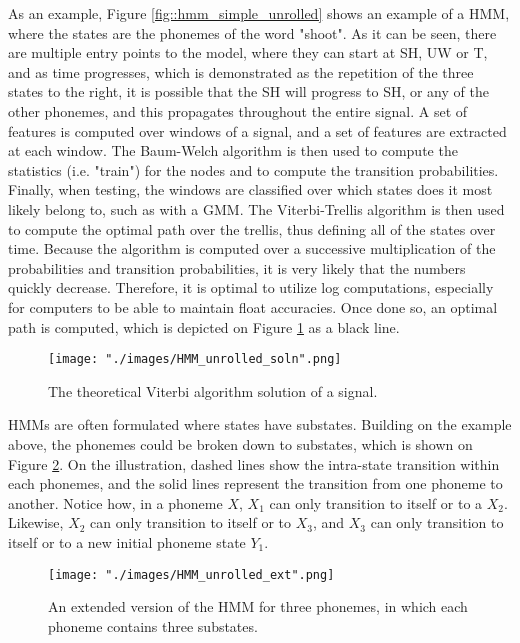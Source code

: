 As an example, Figure \ref{fig::hmm_simple_unrolled} shows an example of a HMM, where the states are the phonemes of the word "shoot". As it can be seen, there are multiple entry points to the model, where they can start at SH, UW or T, and as time progresses, which is demonstrated as the repetition of the three states to the right, it is possible that the SH will progress to SH, or any of the other phonemes, and this propagates throughout the entire signal. A set of features is computed over windows of a signal, and a set of features are extracted at each window. The Baum-Welch algorithm is then used to compute the statistics (i.e. "train") for the nodes and to compute the transition probabilities. Finally, when testing, the windows are classified over which states does it most likely belong to, such as with a GMM. The Viterbi-Trellis algorithm is then used to compute the optimal path over the trellis, thus defining all of the states over time. Because the algorithm is computed over a successive multiplication of the probabilities and transition probabilities, it is very likely that the numbers quickly decrease. Therefore, it is optimal to utilize log computations, especially for computers to be able to maintain float accuracies. Once done so, an optimal path is computed, which is depicted on Figure \ref{fig::hmm_simple_unrolled_soln} as a black line.

\begin{figure}[ht]
\begin{center}
    \texttt{[image: "./images/HMM\_unrolled\_soln".png]}
    \caption{The theoretical Viterbi algorithm solution of a signal.}
    \label{fig::hmm_simple_unrolled_soln}
\end{center}
\end{figure}

HMMs are often formulated where states have substates. Building on the example above, the phonemes could be broken down to substates, which is shown on Figure \ref{fig::hmm_unrolled_ext}. On the illustration, dashed lines show the intra-state transition within each phonemes, and the solid lines represent the transition from one phoneme to another. Notice how, in a phoneme $X$, $X_1$ can only transition to itself or to a $X_2$. Likewise, $X_2$ can only transition to itself or to $X_3$, and $X_3$ can only transition to itself or to a new initial phoneme state $Y_1$.

\begin{figure}[ht]
\begin{center}
    \texttt{[image: "./images/HMM\_unrolled\_ext".png]}
    \caption{An extended version of the HMM for three phonemes, in which each phoneme contains three substates. }
    \label{fig::hmm_unrolled_ext}
\end{center}
\end{figure}

